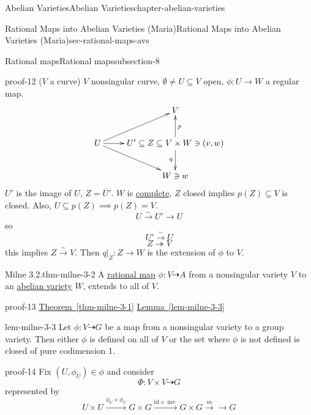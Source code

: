 \documentclass[oneside,10pt,]{book}
\numberwithin{equation}{section}
\newcommand{\id}{\mathrm{id}}
\begin{document}
\begin{chapterptx}{Abelian Varieties}{}{Abelian Varieties}{}{}{chapter-abelian-varieties}
\begin{sectionptx}{Rational Maps into Abelian Varieties (Maria)}{}{Rational Maps into Abelian Varieties (Maria)}{}{}{sec-rational-maps-avs}
\begin{subsectionptx}{Rational maps}{}{Rational maps}{}{}{subsection-8}
\begin{proofptx}{}{proof-12}
(\(V\) a curve) \(V\) nonsingular curve, \(\emptyset\ne U\subseteq V\) open, \(\phi\colon U \to W\) a regular map.%
\begin{equation*}
\xymatrix{
& V\\
U\ar[ur]\ar[dr] \ar[r] & U' \subseteq Z \subseteq V\times W \ni (v,w)\ar[d]_q \ar[u]_p \\
& W \ni w
}
\end{equation*}
\(U'\) is the image of \(U\), \(Z = \overline{U'}\). \(W \) is \hyperref[def-abelian-complete-var]{complete}, \(Z\) closed implies \(p(Z) \subseteq V\) is closed. Also, \(U \subseteq p(Z) \implies p(Z)= V\).%
\begin{equation*}
U\xrightarrow{\sim} U' \to U
\end{equation*}
so%
\begin{equation*}
U' \xrightarrow{\sim} U
\end{equation*}
%
\begin{equation*}
Z \twoheadrightarrow V
\end{equation*}
this implies \(Z \xrightarrow\sim V\). Then \(q|_Z \colon Z \to W\) is the extension of \(\phi \) to \(V\).%
\end{proofptx}
\begin{theorem}{Milne 3.2.}{}{thm-milne-3-2}%
\hypertarget{p-89}{}%
A \hyperref[def-rational-map]{rational map} \(\phi\colon V\dashrightarrow A\) from a nonsingular variety \(V\) to an \hyperref[def-buntes-abvar]{abelian variety} \(W\), extends to all of \(V\).%
\end{theorem}
\begin{proofptx}{}{proof-13}
\hypertarget{p-90}{}%
\hyperref[thm-milne-3-1]{Theorem~\ref{thm-milne-3-1}} \hyperref[lem-milne-3-3]{Lemma~\ref{lem-milne-3-3}}%
\end{proofptx}
\begin{lemma}{}{}{lem-milne-3-3}%
\hypertarget{p-91}{}%
Let \(\phi\colon V \dashrightarrow G\) be a map from a nonsingular variety to a group variety. Then either \(\phi\) is defined on all of \(V\) or the set where \(\phi\) is not defined is closed of pure codimension 1.%
\end{lemma}
\begin{proofptx}{}{proof-14}
\hypertarget{p-92}{}%
Fix \((U, \phi_U) \in \phi\) and consider%
\begin{equation*}
\Phi\colon V\times V \dashrightarrow G
\end{equation*}
represented by%
\begin{equation*}
U\times U\xrightarrow{\phi_U\times\phi_U} G\times G \xrightarrow{\id\times\operatorname{inv}} G\times G \xrightarrow{m} \to G

\end{equation*}
\end{proofptx}
\end{subsectionptx}
\end{sectionptx}
\end{chapterptx}
\end{document}
